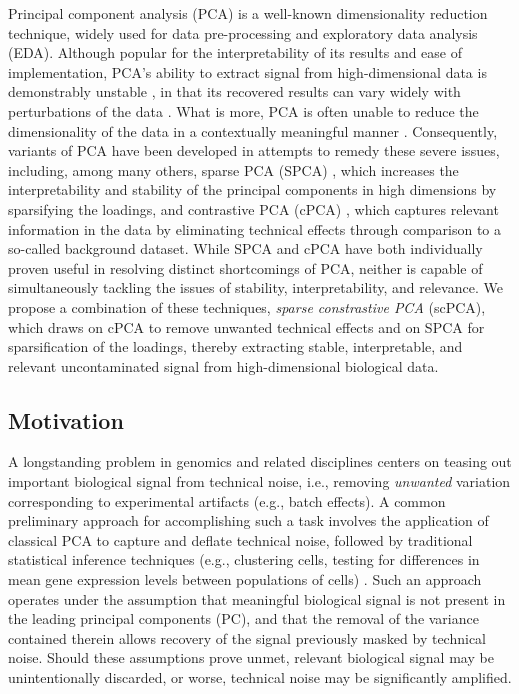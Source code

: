 Principal component analysis (PCA) is a well-known dimensionality reduction technique, widely used for data pre-processing and exploratory data analysis (EDA). Although popular for the interpretability of its results and ease of implementation, PCA's ability to extract signal from high-dimensional data is demonstrably unstable \citep{Shen2013,Johnstone2009}, in that its recovered results can vary widely with perturbations of the data \citep{yu2013}. What is more, PCA is often unable to reduce the dimensionality of the data in a contextually meaningful manner \citep{ringner2008,Abid2018}. Consequently, variants of PCA have been developed in attempts to remedy these severe issues, including, among many others, sparse PCA (SPCA) \citep{Zou2006}, which increases the interpretability and stability of the principal components in high dimensions by sparsifying the loadings, and contrastive PCA (cPCA) \citep{Abid2018}, which captures relevant information in the data by eliminating technical effects through comparison to a so-called background dataset. While SPCA and cPCA have both individually proven useful in resolving distinct shortcomings of PCA, neither is capable of simultaneously tackling the issues of stability, interpretability, and relevance. We propose a combination of these techniques, \textit{sparse constrastive PCA} (scPCA), which draws on cPCA to remove unwanted technical effects and on SPCA for sparsification of the loadings, thereby extracting stable, interpretable, and relevant uncontaminated signal from high-dimensional biological data.

\subsection{Motivation}

A longstanding problem in genomics and related disciplines centers on teasing out important biological signal from technical noise, i.e., removing \textit{unwanted} variation corresponding to experimental artifacts (e.g., batch effects). A common preliminary approach for accomplishing such a task involves the application of classical PCA to capture and deflate technical noise, followed by traditional statistical inference techniques (e.g., clustering cells, testing for differences in mean gene expression levels between populations of cells) \citep{Nguyen2019}. Such an approach operates under the assumption that meaningful biological signal is not present in the leading principal components (PC), and that the removal of the variance contained therein allows recovery of the signal previously masked by technical noise. Should these assumptions prove unmet, relevant biological signal may be unintentionally discarded, or worse, technical noise may be significantly amplified.

